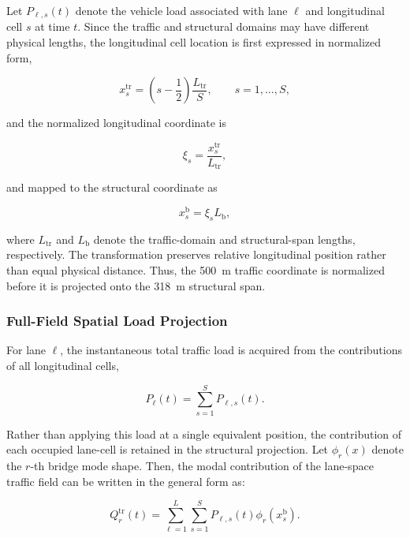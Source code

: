 \documentclass[journal]{IEEEtran}
\begin{document}
Let $P_{\ell,s}(t)$ denote the vehicle load associated with lane $\ell$ and longitudinal cell $s$ at time $t$. Since the traffic and structural domains may have different physical lengths, the longitudinal cell location is first expressed in normalized form,

\begin{equation}
x_s^{\mathrm{tr}}
=
\left(s-\frac{1}{2}\right)
\frac{L_{\mathrm{tr}}}{S},
\qquad
s=1,\ldots,S,
\label{eq:traffic_cell_center}
\end{equation}

and the normalized longitudinal coordinate is

\begin{equation}
\xi_s
=
\frac{x_s^{\mathrm{tr}}}{L_{\mathrm{tr}}},
\label{eq:normalized_cell_coordinate}
\end{equation}

and mapped to the structural coordinate as

\begin{equation}
x_s^{\mathrm{b}}
=
\xi_s L_{\mathrm{b}},
\end{equation}

where $L_{\mathrm{tr}}$ and $L_{\mathrm{b}}$ denote the traffic-domain and structural-span lengths, respectively. The transformation preserves relative longitudinal position rather than equal physical distance. Thus, the 500~m traffic coordinate is normalized before it is projected onto the 318~m structural span.


\subsubsection{Full-Field Spatial Load Projection}

For lane $\ell$, the instantaneous total traffic load is acquired from the contributions of all longitudinal cells,

\begin{equation}
P_{\ell}(t)
=
\sum_{s=1}^{S}
P_{\ell,s}(t).
\end{equation}

Rather than applying this load at a single equivalent position, the contribution of each occupied lane-cell is retained in the structural projection. Let $\phi_r(x)$ denote the $r$-th bridge mode shape. Then, the modal contribution of the lane-space traffic field can be written in the general form as:

\begin{equation}
Q_r^{\mathrm{tr}}(t)
=
\sum_{\ell=1}^{L}
\sum_{s=1}^{S}
P_{\ell,s}(t)
\phi_r\left(x_s^{\mathrm{b}}\right).
\end{equation}
\end{document}
